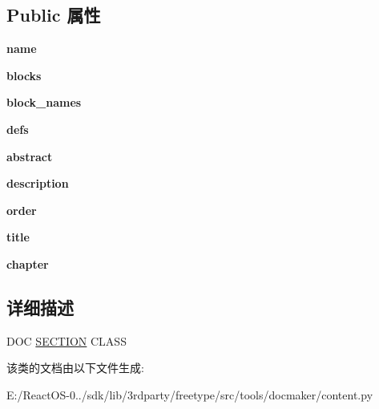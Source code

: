 \subsection*{Public 属性}
\begin{DoxyCompactItemize}
\item 
\mbox{\label{classcontent_1_1_doc_section_aa9cb67b2de8f78fadd5b34b2b7d4fddb}} 
{\bfseries name}
\item 
\mbox{\label{classcontent_1_1_doc_section_a6dc9c56aab747332dd19f9172f17d235}} 
{\bfseries blocks}
\item 
\mbox{\label{classcontent_1_1_doc_section_a525935839adec31fb97a4703a8bba0a9}} 
{\bfseries block\+\_\+names}
\item 
\mbox{\label{classcontent_1_1_doc_section_a1525b192e23ba6adbef463b918f8990b}} 
{\bfseries defs}
\item 
\mbox{\label{classcontent_1_1_doc_section_a9961364eb1241e7dc04328df9d94bb32}} 
{\bfseries abstract}
\item 
\mbox{\label{classcontent_1_1_doc_section_ab3891954b06247b968138f9e237dbe6e}} 
{\bfseries description}
\item 
\mbox{\label{classcontent_1_1_doc_section_ac22720e5560ff80c0b6ca417e7147772}} 
{\bfseries order}
\item 
\mbox{\label{classcontent_1_1_doc_section_ae71dcdfb8cf258b8a3fe08f932ba034a}} 
{\bfseries title}
\item 
\mbox{\label{classcontent_1_1_doc_section_afde8faed627afff80100425031a6a596}} 
{\bfseries chapter}
\end{DoxyCompactItemize}


\subsection{详细描述}
D\+OC \hyperlink{struct_s_e_c_t_i_o_n}{S\+E\+C\+T\+I\+ON} C\+L\+A\+SS 

该类的文档由以下文件生成\+:\begin{DoxyCompactItemize}
\item 
E\+:/\+React\+O\+S-\/0../sdk/lib/3rdparty/freetype/src/tools/docmaker/content.\+py\end{DoxyCompactItemize}
